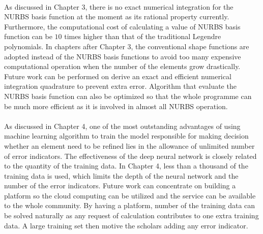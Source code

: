 \paragraph{}
As discussed in Chapter 3, there is no exact numerical integration for the NURBS basis function at the moment as its rational property currently.
Furthermore, the computational cost of calculating a value of NURBS basis function can be $10$ times higher than that of the traditional Legendre polynomials.
In chapters after Chapter 3, the conventional shape functions are adopted instead of the NURBS basis functions to avoid too many expensive computational operation when the number of the elements grow drastically.
Future work can be performed on derive an exact and efficient numerical integration quadrature to prevent extra error.
Algorithm that evaluate the NURBS basis function can also be optimized so that the whole programme can be much more efficient as it is involved in almost all NURBS operation.

\paragraph{}
As discussed in Chapter 4, one of the most outstanding advantages of using machine learning algorithm to train the model responsible for making decision whether an element need to be refined lies in the allowance of unlimited number of error indicators.
The effectiveness of the deep neural network is closely related to the quantity of the training data.
In Chapter 4, less than a thousand of the training data is used, which limits the depth of the neural network and the number of the error indicators.
Future work can concentrate on building a platform so the cloud computing can be utilized and the service can be available to the whole community.
By having a platform, number of the training data can be solved naturally as any request of calculation contributes to one extra training data.
A large training set then motive the scholars adding any error indicator.
